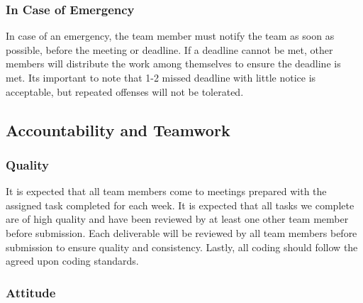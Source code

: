 \documentclass{article}
\begin{document}
\subsubsection*{In Case of Emergency}


\raggedright
In case of an emergency, the team member must notify the team as soon as possible, before
the meeting or deadline. If a deadline cannot be met, other members will distribute 
the work among themselves to ensure the deadline is met. Its important to note that 
1-2 missed deadline with little notice is acceptable, but repeated offenses will not 
be tolerated.

\subsection*{Accountability and Teamwork}

\subsubsection*{Quality} 


\raggedright
It is expected that all team members come to meetings prepared with the assigned
task completed for each week. It is expected that all tasks we complete are of high quality
and have been reviewed by at least one other team member before submission. Each
deliverable will be reviewed by all team members before submission to ensure quality 
and consistency. Lastly, all coding should follow the agreed upon coding standards.


\subsubsection*{Attitude}

\end{document}
